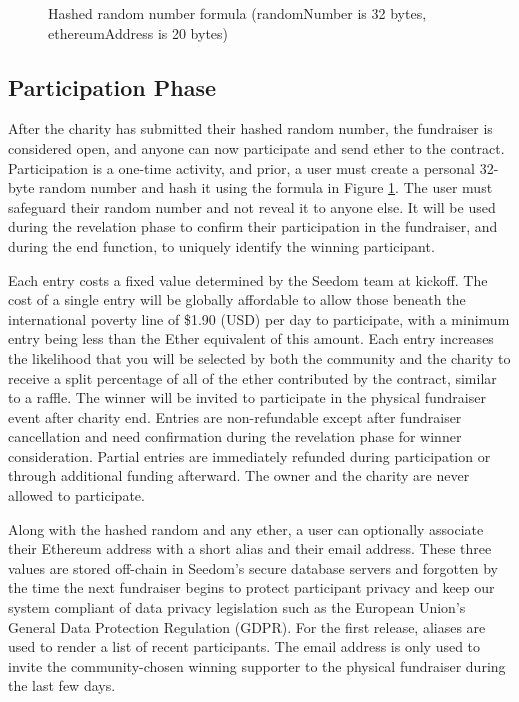 \documentclass[11pt]{article}
\begin{document}
\begin{figure}[H]
\begin{center}
\caption{Hashed random number formula (randomNumber is 32 bytes, ethereumAddress is 20 bytes)}
\label{figure:hashedRandomNumberFormula}
\end{center}
\end{figure}

\subsection{Participation Phase}

After the charity has submitted their hashed random number, the fundraiser is considered open, and anyone can now participate and send ether to the contract. Participation is a one-time activity, and prior, a user must create a personal 32-byte random number and hash it using the formula in Figure \ref{figure:hashedRandomNumberFormula}. The user must safeguard their random number and not reveal it to anyone else. It will be used during the revelation phase to confirm their participation in the fundraiser, and during the end function, to uniquely identify the winning participant.

Each entry costs a fixed value determined by the Seedom team at kickoff. The cost of a single entry will be globally affordable to allow those beneath the international poverty line of \$1.90 (USD) per day \cite{1} to participate, with a minimum entry being less than the Ether equivalent of this amount. Each entry increases the likelihood that you will be selected by both the community and the charity to receive a split percentage of all of the ether contributed by the contract, similar to a raffle. The winner will be invited to participate in the physical fundraiser event after charity end. Entries are non-refundable except after fundraiser cancellation and need confirmation during the revelation phase for winner consideration. Partial entries are immediately refunded during participation or through additional funding afterward. The owner and the charity are never allowed to participate.

Along with the hashed random and any ether, a user can optionally associate their Ethereum address with a short alias and their email address. These three values are stored off-chain in Seedom's secure database servers and forgotten by the time the next fundraiser begins to protect participant privacy and keep our system compliant of data privacy legislation such as the European Union's General Data Protection Regulation (GDPR). For the first release, aliases are used to render a list of recent participants. The email address is only used to invite the community-chosen winning supporter to the physical fundraiser during the last few days.
\end{document}
